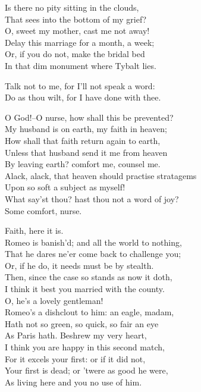 \begin{speech}
Is there no pity sitting in the clouds, \\
That sees into the bottom of my grief? \\
O, sweet my mother, cast me not away! \\
Delay this marriage for a month, a week; \\
Or, if you do not, make the bridal bed \\
In that dim monument where Tybalt lies. \\
\end{speech}
\begin{speech}
Talk not to me, for I'll not speak a word: \\

Do as thou wilt, for I have done with thee.  \\

\end{speech}
\begin{speech}
O God!--O nurse, how shall this be prevented? \\
My husband is on earth, my faith in heaven; \\
How shall that faith return again to earth, \\
Unless that husband send it me from heaven \\
By leaving earth? comfort me, counsel me. \\
Alack, alack, that heaven   should practise stratagems \\
Upon so soft a subject as myself! \\
What say'st thou? hast thou not a word of joy? \\
Some comfort, nurse. \\
\end{speech}
\begin{speech}
Faith, here it is. \\
Romeo is banish'd; and all the world to nothing, \\
That he dares ne'er come back to challenge you; \\
Or, if he do, it needs must be by stealth. \\
Then, since the case so stands as now it doth, \\
I think it best you married with the county. \\
O, he's a lovely gentleman! \\
Romeo's a dishclout to him: an eagle, madam, \\
Hath not so green, so quick, so fair an eye \\
As Paris hath.   Beshrew my very heart, \\
I think you are happy in this second match, \\
For it excels your first: or if it did not, \\
Your first is dead; or 'twere as good he were, \\
As living here and you no use of him. \\
\end{speech}
